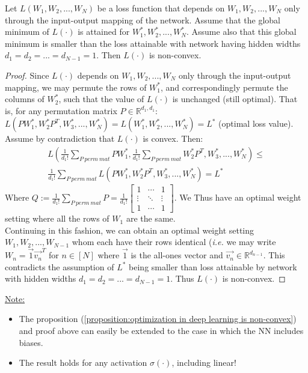 \documentclass[12pt]{article}
\newcommand{\ie}{{\it i.e. }}
\begin{document}
	\begin{proposition}
	\label{proposition:optimization in deep learning is non-convex}				
		Let $L(W_1,W_2,...,W_N)$ be a loss function that depends on $W_1,W_2,...,W_N$ only through the input-output mapping of the network.
		Assume that the global minimum of $L(\cdot)$ is attained for $W_1^\ast, W_2^\ast,...,W_N^\ast$.
		Assume also that this global minimum is smaller than the loss attainable with network having hidden widths $d_1=d_2=...=d_{N-1}=1$.
		Then $L(\cdot)$ is non-convex.
	\end{proposition}
	\begin{proof}
		Since $L(\cdot)$ depends on $W_1,W_2,...,W_N$ only through the input-output mapping, we may permute the rows of $W_1^\ast$, and correspondingly permute the columns of $W_2^\ast$, such that the value of $L(\cdot)$ is unchanged (still optimal).
		That is, for any permutation matrix
		$P\in\mathbb{R}^{d_1,d_1}$: $L(PW_1^\ast,W_2^{\ast}P^T,W_3^\ast,...,W_N^\ast)=L(W_1^\ast,W_2^\ast,...,W_N^\ast)=L^\ast$ (optimal loss value).
		\\Assume by contradiction that $L(\cdot)$ is convex. Then:
		\begin{align*}
    		L(\frac{1}{d_1!}\textstyle \sum_{P\ perm\ mat}{PW_1^\ast}, \frac{1}{d_1!}\textstyle \sum_{P\ perm\ mat} W_2^{\ast}P^T, W_3^\ast, ..., W_N^\ast) \leq
    		\\\frac{1}{d_1!}\sum_{P\ perm\ mat}L(PW_1^\ast,W_2^{\ast}P^T,W_3^\ast,...,W_N^\ast)=L^\ast
	    \end{align*}
	    Where $Q:=\frac{1}{d_1!}\sum_{P\ perm\ mat}P = \frac{1}{d_1!}
	    \begin{bmatrix}
	        1 & \cdots & 1 \\
	        \vdots & \ddots & \vdots \\
	        1 & \cdots & 1
	    \end{bmatrix}$.
	    We Thus have an optimal weight setting where all the rows of $W_1$ are the same.
	    \\Continuing in this fashion, we can obtain an optimal weight setting $W_1,W_2,...,W_{N-1}$ whom each have their rows identical (\ie we may write $W_n=\vec{1}\overrightarrow{v_n}^T$ for $n\in[N]$ where $\vec{1}$ is the all-ones vector and $\overrightarrow{v_n}\in\mathbb{R}^{d_{n-1}}$. This contradicts the assumption of $L^\ast$ being smaller than loss attainable by network with hidden widths $d_1=d_2=...=d_{N-1}=1$. Thus $L(\cdot)$ is non-convex.
	\end{proof}
	\noindent\underline{Note:}
	\begin{itemize}
      \item The proposition (\ref{proposition:optimization in deep learning is non-convex}) and proof above can easily be extended to the case in which the NN includes biases.
      \item The result holds for any activation $\sigma(\cdot)$, including linear!
    \end{itemize}
\end{document}
